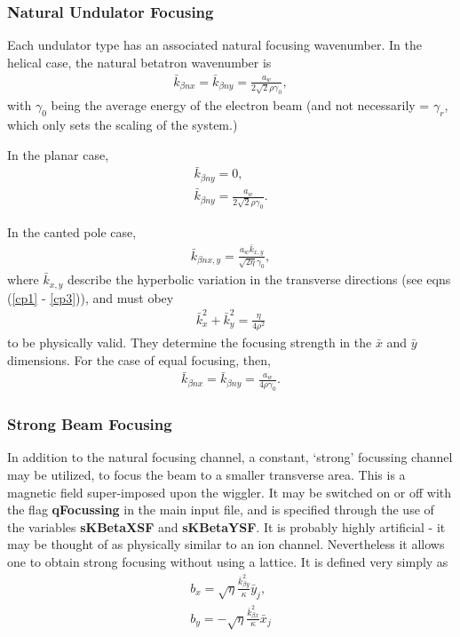 \documentclass[12pt]{article}%
\begin{document}
\subsubsection{Natural Undulator Focusing}

Each undulator type has an associated natural focusing wavenumber. In the helical case, the natural betatron wavenumber is
\begin{align}
\bar{k}_{\beta n x} = \bar{k}_{\beta n y} = \frac{a_w}{2 \sqrt{2} \rho \gamma_0},
\end{align}
with $\gamma_0$ being the average energy of the electron beam (and not necessarily = $\gamma_r$, which only sets the scaling of the system.)

In the planar case,
\begin{align}
\bar{k}_{\beta n y} = 0, \\
\bar{k}_{\beta n y} = \frac{a_w}{2 \sqrt{2} \rho \gamma_0}.
\end{align}

In the canted pole case,
\begin{align}
\bar{k}_{\beta n x,y} = \frac{a_w \bar{k}_{x,y}}{\sqrt{2 \eta} \gamma_0},
\end{align}
where $\bar{k}_{x,y}$ describe the hyperbolic variation in the transverse directions (see eqns (\ref{cp1} - \ref{cp3})), and must obey
\begin{align}
\bar{k}_x^2 + \bar{k}_y^2 = \frac{\eta}{4 \rho^2}
\end{align}
to be physically valid. They determine the focusing strength in the $\bar{x}$ and $\bar{y}$ dimensions. For the case of equal focusing, then,
\begin{align}
\bar{k}_{\beta n x} = \bar{k}_{\beta n y} = \frac{a_w }{ 4 \rho \gamma_0}.
\end{align}



\subsubsection{Strong Beam Focusing}

In addition to the natural focusing channel, a constant, `strong' focussing channel may be utilized, to focus the beam to a smaller transverse area. This is a magnetic field super-imposed upon the wiggler. It may be switched on or off with the flag {\bf qFocussing} in the main input file, and is specified through the use of the variables {\bf sKBetaXSF} and {\bf sKBetaYSF}. It is probably highly artificial - it may be thought of as physically similar to an ion channel. Nevertheless it allows one to obtain strong focusing without using a lattice. It is defined very simply as
\begin{align}
b_x = \sqrt{\eta} \frac{\bar{k}_{\beta y}^2}{\kappa}\bar{y}_j, \\
b_y = - \sqrt{\eta} \frac{\bar{k}_{\beta x}^2}{\kappa}\bar{x}_j
\end{align}
\end{document}
